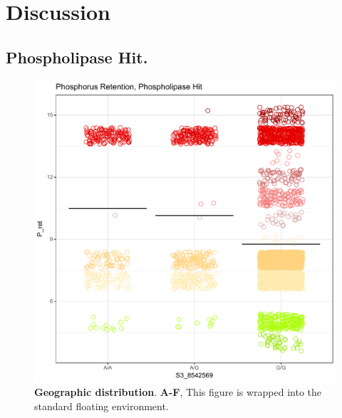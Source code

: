 \documentclass[10pt,letterpaper]{article}
\begin{document}
\section*{Discussion}

\subsection*{Phospholipase Hit.}
\begin{figure}[ht] %


\includegraphics[width=\textwidth]{fig5.pdf}

\caption{\color{Gray} \textbf{Geographic distribution}. \textbf{A-F}, This figure is wrapped into the standard floating environment.}

\label{fig5} %

\end{figure}
\end{document}
